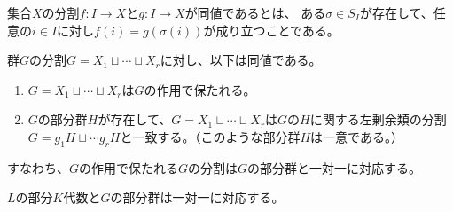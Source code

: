 \begin{proposition}
    \label{decomp-equiv}
    集合$X$の分割$f:I\to X$と$g:I\to X$が同値であるとは、
    ある$\sigma\in S_I$が存在して、任意の$i\in I$に対し$f(i)=g(\sigma(i))$が成り立つことである。
\end{proposition}

\begin{proposition}\label{group-decomp}
    群$G$の分割$G=X_1\sqcup\cdots\sqcup X_r$に対し、以下は同値である。
    \begin{enumerate}
        \item $G=X_1\sqcup\cdots\sqcup X_r$は$G$の作用で保たれる。
        \item $G$の部分群$H$が存在して、$G=X_1\sqcup\cdots\sqcup X_r$は$G$の$H$に関する左剰余類の分割$G=g_1H\sqcup\cdots g_rH$と一致する。（このような部分群$H$は一意である。）
    \end{enumerate}
    すなわち、$G$の作用で保たれる$G$の分割は$G$の部分群と一対一に対応する。
\end{proposition}

\begin{theorem}\label{main}
    $L$の部分$K$代数と$G$の部分群は一対一に対応する。
\end{theorem}